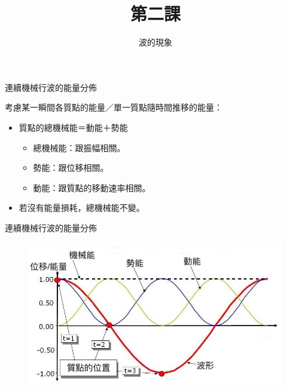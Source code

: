 \documentclass[13pt]{beamer}
\title{第二課}
\author{波的現象}
\institute{全年班}
\date{}
\begin{document}
\frame{\titlepage}

\begin{frame}{連續機械行波的能量分佈}
    \begin{block}{考慮某一瞬間各質點的能量／單一質點隨時間推移的能量：}
        \begin{itemize}
            \item 質點的總機械能＝動能＋勢能
                  \begin{itemize}
                      \item 總機械能：跟振幅相關。
                      \item 勢能：跟位移相關。
                      \item 動能：跟質點的移動速率相關。
                  \end{itemize}
            \item 若沒有能量損耗，總機械能不變。
        \end{itemize}
    \end{block}





\end{frame}


\begin{frame}{連續機械行波的能量分佈}
    \begin{figure}
        \centering
        \includegraphics[width=1\linewidth]{images/231.pic4.jpg}


    \end{figure}
\end{frame}
\end{document}
